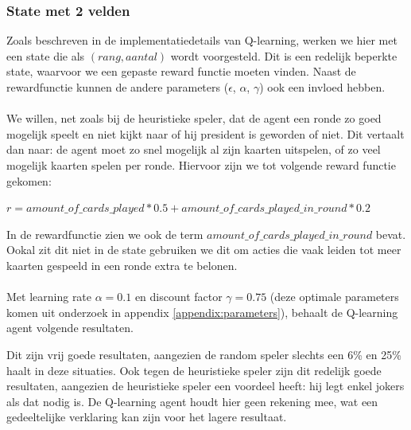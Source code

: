 \documentclass[11pt]{article}
\begin{document}
\subsubsection{State met 2 velden}
Zoals beschreven in de implementatiedetails van Q-learning, werken we hier met een state die als $(rang, aantal)$ wordt voorgesteld. Dit is een redelijk beperkte state, waarvoor we een gepaste reward functie moeten vinden. Naast de rewardfunctie kunnen de andere parameters ($\epsilon$, $\alpha$, $\gamma$) ook een invloed hebben.\\\\
We willen, net zoals bij de heuristieke speler, dat de agent een ronde zo goed mogelijk speelt en niet kijkt naar of hij president is geworden of niet. Dit vertaalt dan naar: de agent moet zo snel mogelijk al zijn kaarten uitspelen, of zo veel mogelijk kaarten spelen per ronde. Hiervoor zijn we tot volgende reward functie gekomen:
\begin{center}
$r = amount\_of\_cards\_played * 0.5 + amount\_of\_cards\_played\_in\_round * 0.2$
\end{center}
In de rewardfunctie zien we ook de term $amount\_of\_cards\_played\_in\_round$ bevat. Ookal zit dit niet in de state gebruiken we dit om acties die vaak leiden tot meer kaarten gespeeld in een ronde extra te belonen.\\\\
Met learning rate $\alpha = 0.1$ en discount factor $\gamma = 0.75$ (deze optimale parameters komen uit onderzoek in appendix \ref{appendix:parameters}), behaalt de Q-learning agent volgende resultaten. 
\begin{table}[H]
        \centering
        \caption{W/L in \% voor Q-table agent}
\end{table}
\noindent Dit zijn vrij goede resultaten, aangezien de random speler slechts een 6\% en 25\% haalt in deze situaties. Ook tegen de heuristieke speler zijn dit redelijk goede resultaten, aangezien de heuristieke speler een voordeel heeft: hij legt enkel jokers als dat nodig is. De Q-learning agent houdt hier geen rekening mee, wat een gedeeltelijke verklaring kan zijn voor het lagere resultaat.
\end{document}

